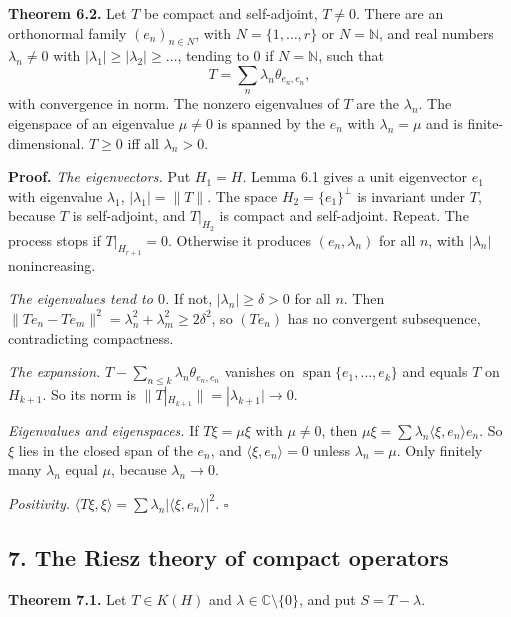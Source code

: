 \documentclass[
  english,
  11pt,
  a4paper,
]{article}
\begin{document}
\textbf{Theorem 6.2.} Let \(T\) be compact and self-adjoint, \(T\ne0\).
There are an orthonormal family \((e_n)_{n\in N}\), with
\(N=\{1,\dots,r\}\) or \(N=\mathbb N\), and real numbers
\(\lambda_n\ne0\) with \(|\lambda_1|\ge|\lambda_2|\ge\dots\), tending to
\(0\) if \(N=\mathbb N\), such that
\[T=\sum_n\lambda_n\theta_{e_n,e_n},\] with convergence in norm. The
nonzero eigenvalues of \(T\) are the \(\lambda_n\). The eigenspace of an
eigenvalue \(\mu\ne0\) is spanned by the \(e_n\) with \(\lambda_n=\mu\)
and is finite-dimensional. \(T\ge0\) iff all \(\lambda_n>0\).

\textbf{Proof.} \emph{The eigenvectors.} Put \(H_1=H\). Lemma 6.1 gives
a unit eigenvector \(e_1\) with eigenvalue \(\lambda_1\),
\(|\lambda_1|=\|T\|\). The space \(H_2=\{e_1\}^\perp\) is invariant
under \(T\), because \(T\) is self-adjoint, and \(T|_{H_2}\) is compact
and self-adjoint. Repeat. The process stops if \(T|_{H_{r+1}}=0\).
Otherwise it produces \((e_n,\lambda_n)\) for all \(n\), with
\(|\lambda_n|\) nonincreasing.

\emph{The eigenvalues tend to \(0\).} If not, \(|\lambda_n|\ge\delta>0\)
for all \(n\). Then
\(\|Te_n-Te_m\|^2=\lambda_n^2+\lambda_m^2\ge2\delta^2\), so \((Te_n)\)
has no convergent subsequence, contradicting compactness.

\emph{The expansion.} \(T-\sum_{n\le k}\lambda_n\theta_{e_n,e_n}\)
vanishes on \(\operatorname{span}\{e_1,\dots,e_k\}\) and equals \(T\) on
\(H_{k+1}\). So its norm is \(\|T|_{H_{k+1}}\|=|\lambda_{k+1}|\to0\).

\emph{Eigenvalues and eigenspaces.} If \(T\xi=\mu\xi\) with \(\mu\ne0\),
then \(\mu\xi=\sum\lambda_n\langle\xi,e_n\rangle e_n\). So \(\xi\) lies
in the closed span of the \(e_n\), and \(\langle\xi,e_n\rangle=0\)
unless \(\lambda_n=\mu\). Only finitely many \(\lambda_n\) equal
\(\mu\), because \(\lambda_n\to0\).

\emph{Positivity.}
\(\langle T\xi,\xi\rangle=\sum\lambda_n|\langle\xi,e_n\rangle|^2\).
\(\square\)

\subsection[7. The Riesz theory of compact
operators]{\texorpdfstring{\protect\hypertarget{hilbert-spaces-and-compact-operators--oa-fnd-hs-07}{}{}7.
The Riesz theory of compact
operators}{7. The Riesz theory of compact operators}}\label{hilbert-spaces-and-compact-operators--OA-FND-HS-07}

\textbf{Theorem 7.1.} Let \(T\in K(H)\) and
\(\lambda\in\mathbb C\setminus\{0\}\), and put \(S=T-\lambda\).
\end{document}
